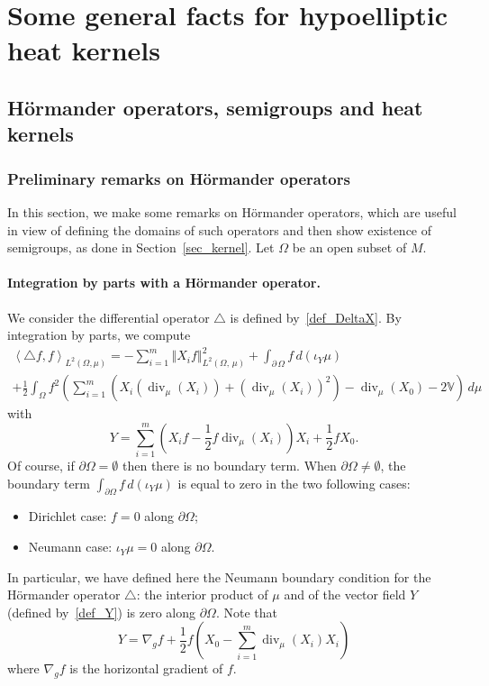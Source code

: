 \documentclass[10pt]{amsart}
\theoremstyle{definition}\newtheorem{defi}[theo]{Definition}\newtheorem{rema}[theo]{Remark}\newtheorem{exam}[theo]{Example}\newtheorem{exem}[theo]{Example}\newtheorem{nota}[theo]{Notation}
\newcommand{\bbV}{\mathbb{V}}
\DeclareMathOperator{\divl}{div}
\begin{document}
\pagebreak
\section{Some general facts for hypoelliptic heat kernels}\label{sec_facts}
\subsection{H\"ormander operators, semigroups and heat kernels}\label{sec_Hormander_kernel}
\subsubsection{Preliminary remarks on H\"ormander operators}\label{sec_rem_Horm}
In this section, we make some remarks on H\"ormander operators, which are useful in view of defining the domains of such operators and then show existence of semigroups, as done in Section~\ref{sec_kernel}. Let $\Omega$ be an open subset of $M$.

\paragraph{Integration by parts with a H\"ormander operator.}
We consider the differential operator $\triangle$ is defined by~\eqref{def_DeltaX}. By integration by parts, we compute
\begin{multline}\label{IPP_Hormander}
\left\langle \triangle f,f\right\rangle_{L^2(\Omega,\mu)} = - \sum_{i=1}^m\left\Vert X_if\right\Vert_{L^2(\Omega,\,\mu)}^2 + \int_{\partial\,\Omega} f\, d\left(\iota_Y\mu\right) \\
+ \frac{1}{2} \int_\Omega f^2 \left(\sum_{i=1}^m \left(X_i\left(\divl_\mu(X_i)\right) + \left(\divl_\mu(X_i)\right)^2 \right) - \divl_\mu(X_0) - 2\bbV \right) \, d\mu
\end{multline}
with
\begin{equation}\label{def_Y}
Y = \sum_{i=1}^m \left(X_if - \frac{1}{2} f\divl_\mu(X_i) \right) X_i + \frac{1}{2}f X_0.
\end{equation}
Of course, if $\partial\Omega=\emptyset$ then there is no boundary term. When $\partial\Omega\neq\emptyset$, the boundary term $\int_{\partial\Omega} f\, d\left(\iota_Y\mu\right)$ is equal to zero in the two following cases:
\begin{itemize}
\item Dirichlet case: $f=0$ along $\partial\Omega$;
\item Neumann case: $\iota_Y\mu=0$ along $\partial\Omega$.
\end{itemize}
In particular, we have defined here the Neumann boundary condition for the H\"ormander operator $\triangle$: the interior product of $\mu$ and of the vector field $Y$ (defined by~\eqref{def_Y}) is zero along $\partial\Omega$. Note that
\[
Y = \nabla_gf + \frac{1}{2} f \left(X_0 - \sum_{i=1}^m \divl_\mu(X_i) X_i \right)
\]
where $\nabla_gf$ is the horizontal gradient of $f$.
\end{document}
